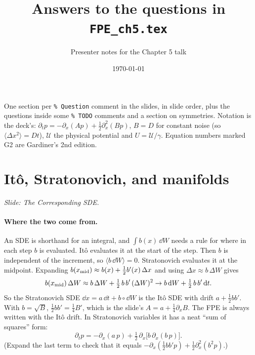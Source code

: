 \documentclass[11pt]{article}
\title{Answers to the questions in \texttt{FPE\_ch5.tex}}
\author{Presenter notes for the Chapter 5 talk}
\date{\today}
\newcommand{\cU}{\mathcal{U}}
\begin{document}
\maketitle

\noindent
One section per \texttt{\% Question} comment in the slides, in slide order, plus the questions inside some
\texttt{\% TODO} comments and a section on symmetries. Notation is the deck's: $\partial_tp=-\partial_x(Ap)+\frac12
\partial_x^2(Bp)$, $B=D$ for constant noise (so $\langle\Delta x^2\rangle=Dt$), $\cU$ the physical potential and
$U=\cU/\gamma$. Equation numbers marked G2 are Gardiner's 2nd edition.

\tableofcontents

\section{It\^o, Stratonovich, and manifolds}
\emph{Slide: The Corresponding SDE.}

\paragraph{Where the two come from.} An SDE is shorthand for an integral, and $\int b(x)\,\dd W$ needs a rule for
where in each step $b$ is evaluated. It\^o evaluates it at the start of the step. Then $b$ is independent of the
increment, so $\langle b\,\dd W\rangle=0$. Stratonovich evaluates it at the midpoint. Expanding
$b(x_{\rm mid})\approx b(x)+\frac12b'(x)\,\Delta x$ and using $\Delta x\approx b\,\Delta W$ gives
\[
  b(x_{\rm mid})\,\Delta W \approx b\,\Delta W + \tfrac12\,b\,b'\,(\Delta W)^2 \to b\,\dd W + \tfrac12\,b\,b'\,\dd t .
\]
So the Stratonovich SDE $\dd x=a\,\dd t+b\circ\dd W$ is the It\^o SDE with drift $a+\frac12bb'$. With $b=\sqrt B$,
$\frac12bb'=\frac14B'$, which is the slide's $A=a+\frac14\partial_xB$. The FPE is always written with the It\^o drift.
In Stratonovich variables it has a neat ``sum of squares'' form:
\[
  \partial_tp = -\partial_x(a\,p) + \tfrac12\,\partial_x\bigl[b\,\partial_x(b\,p)\bigr].
\]
(Expand the last term to check that it equals $-\partial_x(\frac12bb'p)+\frac12\partial_x^2(b^2p)$.)
\end{document}
